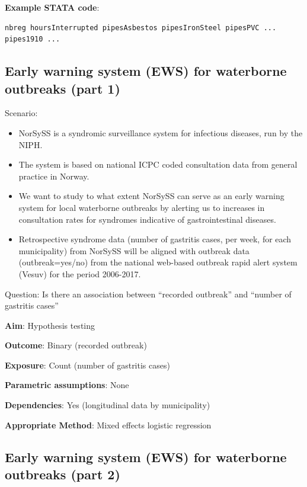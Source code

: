 \documentclass[12pt,]{article}
\providecommand{\tightlist}{%
  \setlength{\itemsep}{0pt}\setlength{\parskip}{0pt}}
\begin{document}
\textbf{Example STATA code}:

\begin{verbatim}
nbreg hoursInterrupted pipesAsbestos pipesIronSteel pipesPVC ... pipes1910 ...
\end{verbatim}

\subsection{Early warning system (EWS) for waterborne outbreaks (part
1)}\label{early-warning-system-ews-for-waterborne-outbreaks-part-1-1}

Scenario:

\begin{itemize}
\tightlist
\item
  NorSySS is a syndromic surveillance system for infectious diseases,
  run by the NIPH.
\item
  The system is based on national ICPC coded consultation data from
  general practice in Norway.
\item
  We want to study to what extent NorSySS can serve as an early warning
  system for local waterborne outbreaks by alerting us to increases in
  consultation rates for syndromes indicative of gastrointestinal
  diseases.\\
\item
  Retrospective syndrome data (number of gastritis cases, per week, for
  each municipality) from NorSySS will be aligned with outbreak data
  (outbreak=yes/no) from the national web-based outbreak rapid alert
  system (Vesuv) for the period 2006-2017.
\end{itemize}

Question: Is there an association between ``recorded outbreak'' and
``number of gastritis cases''

\textbf{Aim}: Hypothesis testing

\textbf{Outcome}: Binary (recorded outbreak)

\textbf{Exposure}: Count (number of gastritis cases)

\textbf{Parametric assumptions}: None

\textbf{Dependencies}: Yes (longitudinal data by municipality)

\textbf{Appropriate Method}: Mixed effects logistic regression

\subsection{Early warning system (EWS) for waterborne outbreaks (part
2)}\label{early-warning-system-ews-for-waterborne-outbreaks-part-2-1}
\end{document}
